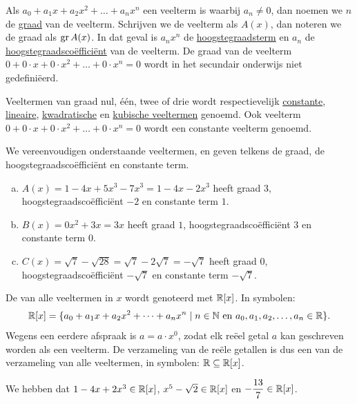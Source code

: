 \documentclass{ximera}
\begin{document}
Als $a_0 + a_1x + a_2x^2 + \dots + a_n x^n$ een veelterm is waarbij $a_n \neq 0$, dan noemen we $n$ de \underline{graad} van de veelterm. Schrijven we de veelterm als $A(x)$, dan noteren we de graad als $\operatorname{gr} A(x)$. In dat geval is $a_nx^n$ de \underline{hoogstegraadsterm} en $a_n$ de \underline{hoogstegraadsco\"effici\"ent} van de veelterm. De graad van de veelterm $0 + 0\cdot x + 0 \cdot x^2 + \dots + 0\cdot x^n = 0$ wordt in het secundair onderwijs niet gedefini\"eerd.

Veeltermen van graad nul, \'e\'en, twee of drie wordt respectievelijk \underline{constante}, \underline{lineaire}, \linebreak \underline{kwadratische} en \underline{kubische veeltermen} genoemd. Ook veelterm $0 + 0\cdot x + 0 \cdot x^2 + \dots + 0\cdot x^n = 0$ wordt een constante veelterm genoemd.

\begin{voorbeeld}
We vereenvoudigen onderstaande veeltermen, en geven telkens de graad, de hoogstegraadsco\"effici\"ent en constante term.
\begin{enumerate}[(a)]
\item
$A(x) = 1-4x+5x^3-7x^3 = 1 - 4x - 2x^3$ heeft graad $3$, hoogstegraadsco\"effici\"ent $-2$ en constante term $1$.
\item
$B(x) = 0x^2 + 3x = 3x$ heeft graad $1$, hoogstegraadsco\"effici\"ent $3$ en constante term $0$.
\item
$C(x) = \sqrt{7}-\sqrt{28} = \sqrt{7}-2\sqrt{7} = -\sqrt{7}$ heeft graad $0$, hoogstegraadsco\"effici\"ent $-\sqrt{7}$ en constante term $-\sqrt{7}$.
\end{enumerate}
\end{voorbeeld}

De  van alle veeltermen in $x$ wordt genoteerd met $\mathbb{R}[x]$. In symbolen:
\[
\mathbb{R}[x] = \{a_0 + a_1 x + a_2 x^2 + \dots + a_n x^n \mid \text{$n \in \mathbb{N}$ en $a_0,a_1,a_2,\ldots,a_n \in \mathbb{R}$} \}.
\]
Wegens een eerdere afspraak is $a = a\cdot x^0$, zodat elk re\"eel getal $a$ kan geschreven worden als een veelterm. De verzameling van de re\"ele getallen is dus een 
van de verzameling van alle veeltermen, in symbolen: $\mathbb{R} \subseteq \mathbb{R}[x]$. 

\begin{voorbeeld} We hebben dat $1-4x+2x^3 \in \mathbb{R}[x]$, $x^5-\sqrt{2} \in \mathbb{R}[x]$ en $\displaystyle -\frac{13}{7} \in \mathbb{R}[x]$.   
\end{voorbeeld}
\end{document}
